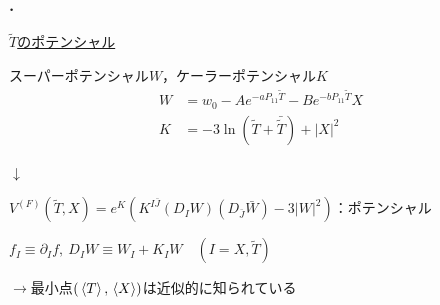 \documentclass[
  a4paper,uplatex,dvipdfmx,11pt,
  xcolor = {dvipsnames,svgnames},
  hyperref ={colorlinks=true,citecolor=Navy,linkcolor=NavyBlue,urlcolor=purple}
]{beamer}
\begin{document}
\begin{frame}
  \frametitle{\thesection.\ \secname}

  \uline{$\tilde{T}$のポテンシャル}

  スーパーポテンシャル$W$，ケーラーポテンシャル$K$
  \begin{align*}
    W
    &=
    w_{0}
    -
    A
    e^{-aP_{11}\tilde{T}}
    -
    Be^{-bP_{11}\tilde{T}}
    X
    \\
    K
    &=
    -
    3\ln (\tilde{T}+\bar{\tilde{T}})
    +
    |X|^2
  \end{align*}

  \vspace*{-15pt}

  \begin{center}
    {\LARGE $\downarrow$}
  \end{center}

  \vspace*{-8pt}

  \hspace*{-18pt}
  $\displaystyle  
    V^{(F)}(\tilde{T},X)
    =
    e^{K}
    (
      K^{I\bar{J}}(D_{I}W)(D_{\bar{J}}\bar{W})
      -
      3|W|^2
    )
  $：ポテンシャル

  \vspace*{-10pt}

  \begin{center}
    $
      f_{I}
      \equiv
      \partial_{I}f
      ,\ 
      D_{I}W
      \equiv
      W_{I}+K_{I}W
      \quad
      (I=X,\tilde{T})
    $
  \end{center}

  \vspace*{-10pt}

  \begin{flushright}
    $\rightarrow$最小点$(\ev*{T},\ev*{X})$は近似的に知られている    
  \end{flushright}

\end{frame}
\end{document}
